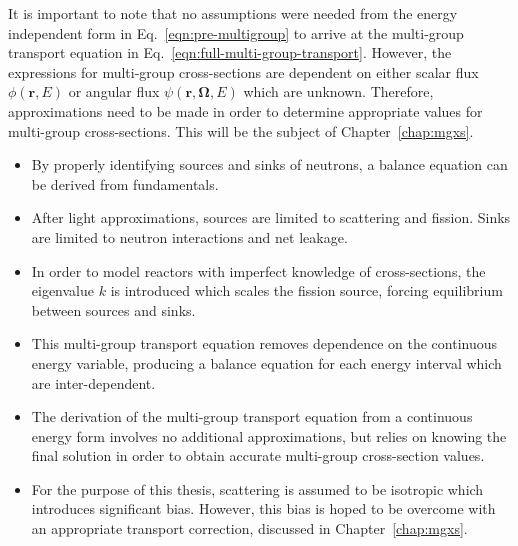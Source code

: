 It is important to note that no assumptions were needed from the energy independent form in Eq.~\ref{eqn:pre-multigroup} to arrive at the multi-group transport equation in Eq.~\ref{eqn:full-multi-group-transport}. However, the expressions for multi-group cross-sections are dependent on either scalar flux $\phi(\mathbf{r}, E)$ or angular flux $\psi(\mathbf{r},\mathbf{\Omega},E)$ which are unknown. Therefore, approximations need to be made in order to determine appropriate values for multi-group cross-sections. This will be the subject of Chapter~\ref{chap:mgxs}.

\newpage
\vfill
\begin{highlightsbox}[frametitle=Highlights]
	\begin{itemize}
		\item By properly identifying sources and sinks of neutrons, a balance equation can be derived from fundamentals.
		\item After light approximations, sources are limited to scattering and fission. Sinks are limited to neutron interactions and net leakage.
		\item In order to model reactors with imperfect knowledge of cross-sections, the eigenvalue $k$ is introduced which scales the fission source, forcing equilibrium between sources and sinks.
		\item This multi-group transport equation removes dependence on the continuous energy variable, producing a balance equation for each energy interval which are inter-dependent.
		\item The derivation of the multi-group transport equation from a continuous energy form involves no additional approximations, but relies on knowing the final solution in order to obtain accurate multi-group cross-section values.
		\item For the purpose of this thesis, scattering is assumed to be isotropic which introduces significant bias. However, this bias is hoped to be overcome with an appropriate transport correction, discussed in Chapter~\ref{chap:mgxs}.
	\end{itemize}
\end{highlightsbox}
\vfill